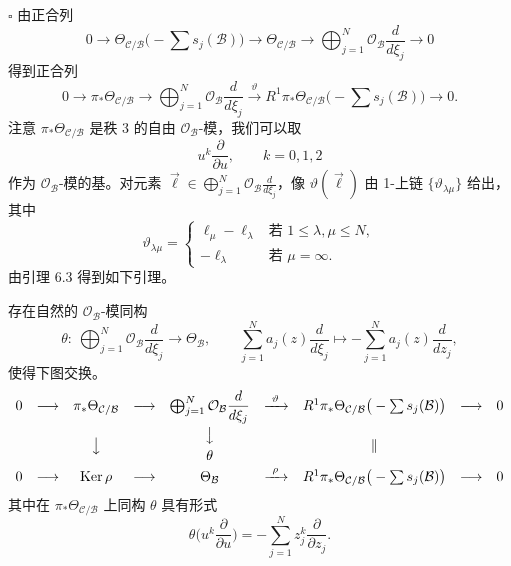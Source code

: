 \hfill$\square$
由正合列
\[
0\to\Theta_{\mathcal{C}/\mathcal{B}}\Big(-\sum s_j(\mathcal{B})\Big)\to\Theta_{\mathcal{C}/\mathcal{B}}\to\bigoplus_{j=1}^{N}\mathcal{O}_{\mathcal{B}}\frac{d}{d\xi_j}\to0
\]
得到正合列
\[
0\to\pi_*\Theta_{\mathcal{C}/\mathcal{B}}\to\bigoplus_{j=1}^{N}\mathcal{O}_{\mathcal{B}}\frac{d}{d\xi_j}\xrightarrow{\vartheta}R^1\pi_*\Theta_{\mathcal{C}/\mathcal{B}}\Big(-\sum s_j(\mathcal{B})\Big)\to0.
\]
注意 $\pi_*\Theta_{\mathcal{C}/\mathcal{B}}$ 是秩 3 的自由 $\mathcal{O}_{\mathcal{B}}$-模，我们可以取
\[
u^{k}\frac{\partial}{\partial u},\qquad k=0,1,2
\]
作为 $\mathcal{O}_{\mathcal{B}}$-模的基。对元素 $\vec\ell\in\bigoplus_{j=1}^{N}\mathcal{O}_{\mathcal{B}}\frac{d}{d\xi_j}$，像 $\vartheta(\vec\ell)$ 由 1-上链 $\{\vartheta_{\lambda\mu}\}$ 给出，其中
\[
\vartheta_{\lambda\mu}=\begin{cases}\ell_\mu-\ell_\lambda & \text{若 } 1\le\lambda,\mu\le N,\\ -\ell_\lambda & \text{若 } \mu=\infty.\end{cases}
\]
由引理 6.3 得到如下引理。
\begin{lemma}[6.4]
存在自然的 $\mathcal{O}_{\mathcal{B}}$-模同构
\[
\theta:\ \bigoplus_{j=1}^{N}\mathcal{O}_{\mathcal{B}}\frac{d}{d\xi_j}\longrightarrow\Theta_{\mathcal{B}},\qquad
\sum_{j=1}^{N}a_j(z)\frac{d}{d\xi_j}\longmapsto-\sum_{j=1}^{N}a_j(z)\frac{d}{dz_j},
\]
使得下图交换。
\[
\begin{array}{ccccccccc}
0 & \longrightarrow & \pi_*\Theta_{\mathcal{C}/\mathcal{B}} & \longrightarrow & \bigoplus_{j=1}^{N}\mathcal{O}_{\mathcal{B}}\dfrac{d}{d\xi_j} & \xrightarrow{\ \vartheta\ } & R^1\pi_*\Theta_{\mathcal{C}/\mathcal{B}}\big(-\sum s_j(\mathcal{B})\big) & \longrightarrow & 0\\[3mm]
 & & \big\downarrow & & \begin{array}{c}\big\downarrow\\[1mm] \theta\end{array} & & \Vert & & \\[3mm]
0 & \longrightarrow & \operatorname{Ker}\rho & \longrightarrow & \Theta_{\mathcal{B}} & \xrightarrow{\ \rho\ } & R^1\pi_*\Theta_{\mathcal{C}/\mathcal{B}}\big(-\sum s_j(\mathcal{B})\big) & \longrightarrow & 0
\end{array}
\]
其中在 $\pi_*\Theta_{\mathcal{C}/\mathcal{B}}$ 上同构 $\theta$ 具有形式
\[
\theta\Big(u^{k}\frac{\partial}{\partial u}\Big)=-\sum_{j=1}^{N}z_j^{k}\frac{\partial}{\partial z_j}.
\]
\end{lemma}

